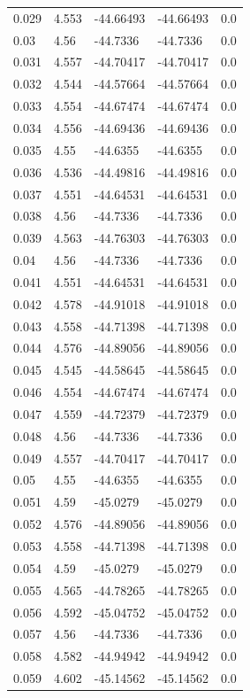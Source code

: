 \begin{tabular}{lllll}
0.029 & 4.553 & -44.66493 & -44.66493 & 0.0 \\
0.03 & 4.56 & -44.7336 & -44.7336 & 0.0 \\
0.031 & 4.557 & -44.70417 & -44.70417 & 0.0 \\
0.032 & 4.544 & -44.57664 & -44.57664 & 0.0 \\
0.033 & 4.554 & -44.67474 & -44.67474 & 0.0 \\
0.034 & 4.556 & -44.69436 & -44.69436 & 0.0 \\
0.035 & 4.55 & -44.6355 & -44.6355 & 0.0 \\
0.036 & 4.536 & -44.49816 & -44.49816 & 0.0 \\
0.037 & 4.551 & -44.64531 & -44.64531 & 0.0 \\
0.038 & 4.56 & -44.7336 & -44.7336 & 0.0 \\
0.039 & 4.563 & -44.76303 & -44.76303 & 0.0 \\
0.04 & 4.56 & -44.7336 & -44.7336 & 0.0 \\
0.041 & 4.551 & -44.64531 & -44.64531 & 0.0 \\
0.042 & 4.578 & -44.91018 & -44.91018 & 0.0 \\
0.043 & 4.558 & -44.71398 & -44.71398 & 0.0 \\
0.044 & 4.576 & -44.89056 & -44.89056 & 0.0 \\
0.045 & 4.545 & -44.58645 & -44.58645 & 0.0 \\
0.046 & 4.554 & -44.67474 & -44.67474 & 0.0 \\
0.047 & 4.559 & -44.72379 & -44.72379 & 0.0 \\
0.048 & 4.56 & -44.7336 & -44.7336 & 0.0 \\
0.049 & 4.557 & -44.70417 & -44.70417 & 0.0 \\
0.05 & 4.55 & -44.6355 & -44.6355 & 0.0 \\
0.051 & 4.59 & -45.0279 & -45.0279 & 0.0 \\
0.052 & 4.576 & -44.89056 & -44.89056 & 0.0 \\
0.053 & 4.558 & -44.71398 & -44.71398 & 0.0 \\
0.054 & 4.59 & -45.0279 & -45.0279 & 0.0 \\
0.055 & 4.565 & -44.78265 & -44.78265 & 0.0 \\
0.056 & 4.592 & -45.04752 & -45.04752 & 0.0 \\
0.057 & 4.56 & -44.7336 & -44.7336 & 0.0 \\
0.058 & 4.582 & -44.94942 & -44.94942 & 0.0 \\
0.059 & 4.602 & -45.14562 & -45.14562 & 0.0 \\

\end{tabular}
